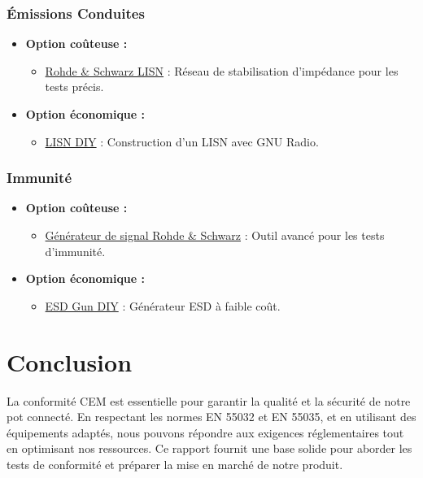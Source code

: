 \documentclass[a4paper,12pt]{article}
\begin{document}
\subsubsection{Émissions Conduites}
\begin{itemize}
    \item \textbf{Option coûteuse :}
          \begin{itemize}
              \item \href{https://www.rohde-schwarz.com/fr/produits/test-et-mesure/tests-conduits/rs-hm6050-two-line-v-network-lisn_63493-48135.html}{Rohde \& Schwarz LISN} : Réseau de stabilisation d'impédance pour les tests précis.
          \end{itemize}
    \item \textbf{Option économique :}
          \begin{itemize}
              \item \href{https://hackaday.io/project/181265-diy-cispr-25-lisn}{LISN DIY} : Construction d’un LISN avec GNU Radio.
          \end{itemize}
\end{itemize}

\subsubsection{Immunité}
\begin{itemize}
    \item \textbf{Option coûteuse :}
          \begin{itemize}
              \item \href{https://www.keysight.com/us/en/assets/7018-05702/technical-overviews/5992-2241.pdf}{Générateur de signal Rohde \& Schwarz} : Outil avancé pour les tests d’immunité.
          \end{itemize}
    \item \textbf{Option économique :}
          \begin{itemize}
              \item \href{https://www.crowdsupply.com/era-instruments/erasynth-micro}{ESD Gun DIY} : Générateur ESD à faible coût.
          \end{itemize}
\end{itemize}

\newpage

\section*{Conclusion}
La conformité CEM est essentielle pour garantir la qualité et la sécurité de notre pot connecté. En respectant les normes EN 55032 et EN 55035, et en utilisant des équipements adaptés, nous pouvons répondre aux exigences réglementaires tout en optimisant nos ressources. Ce rapport fournit une base solide pour aborder les tests de conformité et préparer la mise en marché de notre produit.
\end{document}
